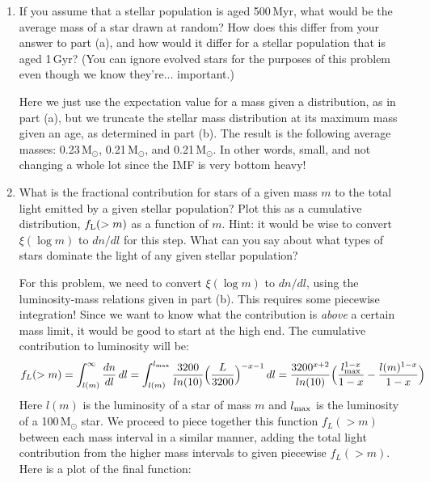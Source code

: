 \documentclass[11pt]{article}
\begin{document}
\begin{enumerate}
\begin{enumerate}
{}

    \item If you assume that a stellar population is aged 500\,Myr,
      what would be the average mass of a star drawn at random?  How
      does this differ from your answer to part (a), and how would it
      differ for a stellar population that is aged 1\,Gyr? (You can
      ignore evolved stars for the purposes of this problem even
      though we know they're... important.)

{\color{gray} Here we just use the expectation value for a mass given
  a distribution, as in part (a), but we truncate the stellar mass
  distribution at its maximum mass given an age, as determined in part
  (b).  The result is the following average masses: 0.23\,M$_\odot$,
  0.21\,M$_\odot$, and 0.21\,M$_\odot$.  In other words, small, and
  not changing a whole lot since the IMF is very bottom heavy!}

    \item What is the fractional contribution for stars of a given
      mass $m$ to the total light emitted by a given stellar
      population?  Plot this as a cumulative distribution, $f_{\rm
        L}(>m)$ as a function of $m$.  Hint: it would be wise to
      convert $\xi(\log\!m)$ to $dn/dl$ for this step.  What can you
      say about what types of stars dominate the light of any given
      stellar population?

{\color{gray} For this problem, we need to convert $\xi(\log m)$ to
  $dn/dl$, using the luminosity-mass relations given in part (b).
  This requires some piecewise integration!  Since we want to know
  what the contribution is {\it above} a certain mass limit, it would
  be good to start at the high end.  The cumulative contribution to
  luminosity will be:
\begin{equation}
f_L(>m) = \int_{l(m)}^{\infty} \frac{dn}{dl}\,dl = \int_{l(m)}^{l_{\rm max}}\frac{3200}{ln(10)}\Big(\frac{L}{3200}\Big)^{-x-1}\,dl = \frac{3200^{x+2}}{ln(10)}\Big(\frac{l_{\rm max}^{1-x}}{1-x}-\frac{l(m)^{1-x}}{1-x}\Big)
\end{equation}
Here $l(m)$ is the luminosity of a star of mass $m$ and $l_{\rm max}$
is the luminosity of a 100\,M$_\odot$ star.  We proceed to piece
together this function $f_{L}(>m)$ between each mass interval in a
similar manner, adding the total light contribution from the higher
mass intervals to given piecewise $f_{L}(>m)$.  Here is a plot of the
final function:}
\begin{figure}[h!]
\centering
\end{figure}


\end{enumerate}
\end{enumerate}
\end{document}

